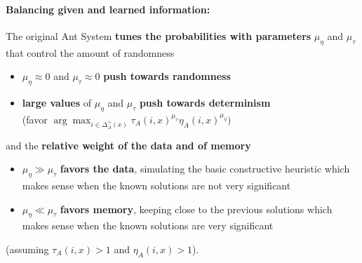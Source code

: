 \paragraph{Balancing given and learned information:} The original Ant System \textbf{tunes the probabilities with parameters} $\mu_{\eta}$ and $\mu_{\tau}$ that control the amount of randomness
\begin{itemize}
	\item $\mu_{\eta} \approx 0$ and $\mu_{\tau} \approx 0$ \textbf{push towards randomness}
	
	\item \textbf{large values} of $\mu_{\eta}$ and $\mu_{\tau}$ \textbf{push towards determinism} \\
	(favor $\arg \max_{i \in \Delta_A^+ (x)} \tau_A (i, x)^{\mu_{\tau}}  \eta_A (i, x)^{\mu_{\eta}})$
\end{itemize}

and the \textbf{relative weight of the data and of memory}
\begin{itemize}
	\item $\mu_{\eta} \gg \mu_{\tau}$ \textbf{favors the data}, simulating the basic constructive heuristic which makes sense when the known solutions are not very significant
	
	\item $\mu_{\eta} \ll \mu_{\tau}$ \textbf{favors memory}, keeping close to the previous solutions which makes sense when the known solutions are very significant
\end{itemize}

(assuming $\tau_A (i, x) > 1$ and $\eta_A (i, x) > 1$).\\

